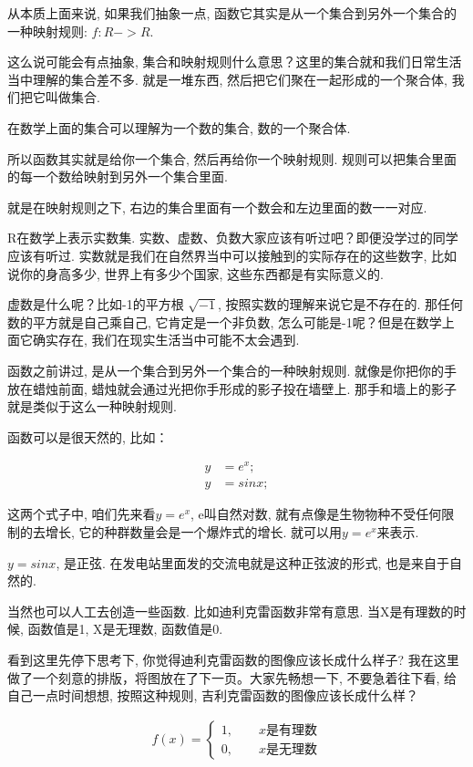 从本质上面来说, 如果我们抽象一点, 函数它其实是从一个集合到另外一个集合的一种映射规则: $f:R -> R$.

这么说可能会有点抽象, 集合和映射规则什么意思？这里的集合就和我们日常生活当中理解的集合差不多. 就是一堆东西, 然后把它们聚在一起形成的一个聚合体, 我们把它叫做集合. 

在数学上面的集合可以理解为一个数的集合, 数的一个聚合体. 

所以函数其实就是给你一个集合, 然后再给你一个映射规则. 规则可以把集合里面的每一个数给映射到另外一个集合里面. 

就是在映射规则之下, 右边的集合里面有一个数会和左边里面的数一一对应. 

R在数学上表示实数集. 实数、虚数、负数大家应该有听过吧？即便没学过的同学应该有听过. 实数就是我们在自然界当中可以接触到的实际存在的这些数字, 比如说你的身高多少, 世界上有多少个国家, 这些东西都是有实际意义的. 

虚数是什么呢？比如-1的平方根 $\sqrt{-1}$, 按照实数的理解来说它是不存在的. 那任何数的平方就是自己乘自己, 它肯定是一个非负数, 怎么可能是-1呢？但是在数学上面它确实存在, 我们在现实生活当中可能不太会遇到. 

函数之前讲过, 是从一个集合到另外一个集合的一种映射规则. 就像是你把你的手放在蜡烛前面, 蜡烛就会通过光把你手形成的影子投在墙壁上. 那手和墙上的影子就是类似于这么一种映射规则. 

函数可以是很天然的, 比如：

\begin{align*}
  y & = e^x; \\
  y & = sinx;
\end{align*}

这两个式子中, 咱们先来看$y=e^x$, e叫自然对数, 就有点像是生物物种不受任何限制的去增长, 它的种群数量会是一个爆炸式的增长. 就可以用$y=e^x$来表示. 

$y=sinx$, 是正弦. 在发电站里面发的交流电就是这种正弦波的形式, 也是来自于自然的. 

当然也可以人工去创造一些函数. 比如迪利克雷函数非常有意思. 当X是有理数的时候, 函数值是1, X是无理数, 函数值是0. 

看到这里先停下思考下, 你觉得迪利克雷函数的图像应该长成什么样子? 我在这里做了一个刻意的排版，将图放在了下一页。大家先畅想一下, 不要急着往下看, 给自己一点时间想想, 按照这种规则, 吉利克雷函数的图像应该长成什么样？

\begin{align*}
  f(x) = 
  \begin{cases}
    1, \qquad  x \mbox{是有理数} \\
    0, \qquad  x \mbox{是无理数}
  \end{cases}
\end{align*}

